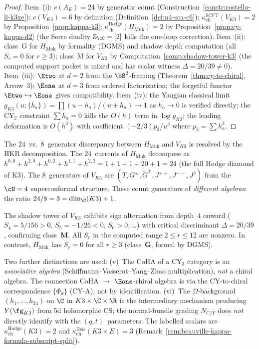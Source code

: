\begin{proof}
Item~(i): $c(A_E) = 24$ by generator count (Construction~\ref{constr:costello-li-k3xe}); $c(V_{K3}) = 6$ by definition (Definition~\ref{def:n4-sca-c6}); $\kappa_{\mathrm{ch}}^{\mathrm{SCFT}}(V_{K3}) = 2$ by Proposition~\ref{prop:kappa-k3}; $\kappa_{\mathrm{ch}}^{\mathrm{Hodge}}(H_{\mathrm{Muk}}) = 2$ by Proposition~\ref{prop:cy-kappa-d2} (the Serre duality $\mathbb{S}_{\cC} = [2]$ kills the one-loop correction). Item~(ii): class~G for $H_{\mathrm{Muk}}$ by formality (DGMS) and shadow depth computation (all $S_r = 0$ for $r \geq 3$); class~M for $V_{K3}$ by Computation~\ref{comp:shadow-tower-k3} (the computed support packet is mixed and has scalar witness $\Delta = 20/39 \neq 0$). Item~(iii): $\Etwo$ at $d = 2$ from the $\bS^2$-framing (Theorem~\ref{thm:cy-to-chiral}, Arrow~3); $\Eone$ at $d = 3$ from ordered factorization; the forgetful functor $\Etwo \hookrightarrow \Eone$ gives compatibility. Item~(iv): the Yangian classical limit $g_{K3}(u; \{h_a\}) = \prod(u - h_a)/(u + h_a) \to 1$ as $h_a \to 0$ is verified directly; the CY$_2$ constraint $\sum h_a = 0$ kills the $O(h)$ term in $\log g_{K3}$; the leading deformation is $O(h^3)$ with coefficient $(-2/3) p_3 / u^3$ where $p_3 = \sum h_a^3$.
\end{proof}

\begin{remark}
\label{rem:hcs-sigma-deepened}
The $24$~vs.~$8$~generator discrepancy between $H_{\mathrm{Muk}}$ and $V_{K3}$ is resolved by the HKR decomposition. The $24$~currents of $H_{\mathrm{Muk}}$ decompose as $h^{0,0} + h^{2,0} + h^{0,2} + h^{1,1} + h^{2,2} = 1 + 1 + 1 + 20 + 1 = 24$ (the full Hodge diamond of K3). The $8$~generators of $V_{K3}$ are $(T, G^\pm, \widetilde{G}^\pm, J^{++}, J^{--}, J^3)$ from the $\cN = 4$ superconformal structure. These count generators of \emph{different algebras}: the ratio $24/8 = 3 = \dim_\C(K3) + 1$.

The shadow tower of $V_{K3}$ exhibits sign alternation from depth~$4$ onward ($S_4 = 5/156 > 0$, $S_5 = -1/26 < 0$, $S_6 > 0$, \ldots) with critical discriminant $\Delta = 20/39$, confirming class~$\mathbf{M}$. All $S_r$ in the computed range $2 \leq r \leq 12$ are nonzero. In contrast, $H_{\mathrm{Muk}}$ has $S_r = 0$ for all $r \geq 3$ (class~$\mathbf{G}$, formal by DGMS).

Two further distinctions are used: (v)~The CoHA of a CY$_3$ category is an \emph{associative algebra} (Schiffmann--Vasserot--Yang--Zhao multiplication), \emph{not} a chiral algebra. The connection CoHA $\to$ $\Eone$-chiral algebra is via the CY-to-chiral correspondence $\{\Phi_d\}$ (CY-A), not by identification. (vi)~The $\Omega$-background $(h_1, \ldots, h_{24})$ on $\C$ in $K3 \times \C \times \R$ is the intermediary mechanism producing $Y(\fg_{K3})$ from 5d holomorphic CS; the normal-bundle grading $N_{C/Y}$ does \emph{not} directly identify with the $(q,t)$~parameters. The labelled scalars are $\kappa_{\mathrm{ch}}^{\mathrm{Hodge}}(K3)=2$ and $\kappa_{\mathrm{ch}}^{\mathrm{Heis}}(K3\times E)=3$ (Remark~\ref{rem:beauville-kappa-formula-subscript-split}).
\end{remark}

